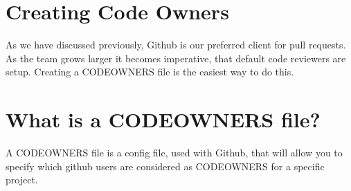 \maketitle{}
\section{ Creating Code Owners }

As we have discussed previously, Github is our preferred client for pull
requests. As the team grows larger it becomes imperative, that default code
reviewers are setup. Creating a CODEOWNERS file is the easiest way to do this.

\section{ What is a CODEOWNERS file? }
A CODEOWNERS file is a config file, used with Github, that will allow you to
specify which github users are considered as CODEOWNERS for a specific project.
